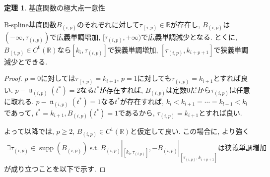 \documentclass{jsarticle}
\newcommand\setR{\mathbb{R}}
\newcommand\squa[1]{[#1]}
\DeclareMathOperator{\supp}{supp}
\DeclareMathOperator{\N}{\mathfrak{n}}
\theoremstyle{definition}%
\newtheorem{thm}{定理}
\begin{document}
\begin{screen}
	\begin{thm}
        \label{Thm313}
        基底関数の極大点一意性

        B-spline基底関数$B_{(i,p)}$のそれぞれに対して$\tau_{(i,p)}\in \setR$が存在し, $B_{(i,p)}$は$(-\infty, \tau_{(i,p)})$で広義単調増加, $[\tau_{(i,p)},+\infty)$で広義単調減少となる.
        とくに, $B_{(i,p)}\in C^0(\setR)$なら$[k_{i},\tau_{(i,p)}]$で狭義単調増加, $[\tau_{(i,p)}, k_{i+p+1}]$で狭義単調減少とできる.
	\end{thm}
\end{screen}
\begin{proof}
    $p=0$に対しては$\tau_{(i,p)}=k_{i+1}$, $p=1$に対しても$\tau_{(i,p)}=k_{i+1}$とすれば良い.
    $p-\N_{(i,p)}(t^*)=2$なる$t^*$が存在すれば, $B_{(i,p)}$は定数0だから$\tau_{(i,p)}$は任意に取れる.
    $p-\N_{(i,p)}(t^*)=1$なる$t^*$が存在すれば, $k_{i}<k_{i+1}=\cdots=k_{l-1}<k_{l}$であって, $t^*=k_{i+1}, B_{(i,p)}(t^*)=1$であるから, $\tau_{(i,p)}=k_{i+1}$とすれば良い.

    よって以降では, $p\ge 2$, $B_{(i,p)}\in C^1(\setR)$と仮定して良い.
    この場合に, より強く
    \begin{align}
        \label{Eqn303}
        \exists \tau_{(i,p)}\in \supp(B_{(i,p)}) \ \text{s.t.} \ B_{(i,p)}|_{\squa{k_{i}, \tau_{(i,p)}}}, -B_{(i,p)}|_{\squa{\tau_{(i,p)},k_{i+p+1}}}は狭義単調増加
    \end{align}
    が成り立つことを以下で示す.


\end{proof}
\end{document}
